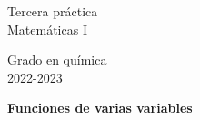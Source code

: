 \documentclass{article}
\title{\tit}
\author{}
\date{}
\def\tit{Funciones de varias variables}
\begin{document}
\noindent\begin{minipage}{.4\textwidth}
\large
Tercera práctica\\
Matemáticas I
\end{minipage}
\hfill
\begin{minipage}{.4\textwidth}
\large
\flushright
Grado en química\\
2022-2023
\end{minipage}

\bigskip

\begin{center}
\textbf{
\huge
\tit
}
\end{center}


\end{document}
